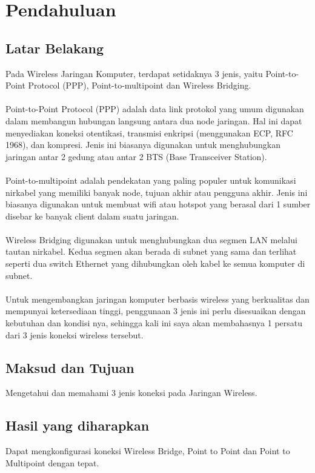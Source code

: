 \section{Pendahuluan}
\subsection{Latar Belakang}
Pada Wireless Jaringan Komputer, terdapat setidaknya 3 jenis, yaitu Point-to-Point Protocol
(PPP), Point-to-multipoint dan Wireless Bridging.\\\\
Point-to-Point Protocol (PPP) adalah data link protokol yang umum digunakan dalam
membangun hubungan langsung antara dua node jaringan. Hal ini dapat menyediakan koneksi
otentikasi, transmisi enkripsi (menggunakan ECP, RFC 1968), dan kompresi. Jenis ini
biasanya digunakan untuk menghubungkan jaringan antar 2 gedung atau antar 2 BTS (Base
Transceiver Station).\\\\
Point-to-multipoint adalah pendekatan yang paling populer untuk komunikasi nirkabel yang
memiliki banyak node, tujuan akhir atau pengguna akhir. Jenis ini biasanya digunakan untuk
membuat wifi atau hotspot yang berasal dari 1 sumber disebar ke banyak client dalam suatu
jaringan.\\\\
Wireless Bridging digunakan untuk menghubungkan dua segmen LAN melalui tautan
nirkabel. Kedua segmen akan berada di subnet yang sama dan terlihat seperti dua switch
Ethernet yang dihubungkan oleh kabel ke semua komputer di subnet.\\\\
Untuk mengembangkan jaringan komputer berbasis wireless yang berkualitas dan mempunyai
ketersediaan tinggi, penggunaan 3 jenis ini perlu disesuaikan dengan kebutuhan dan kondisi
nya, sehingga kali ini saya akan membahasnya 1 persatu dari 3 jenis koneksi wireless
tersebut.


\subsection{Maksud dan Tujuan}
Mengetahui dan memahami 3 jenis koneksi pada Jaringan Wireless.

\subsection{Hasil yang diharapkan}
Dapat mengkonfigurasi koneksi Wireless Bridge, Point to Point dan Point to Multipoint
dengan tepat.

